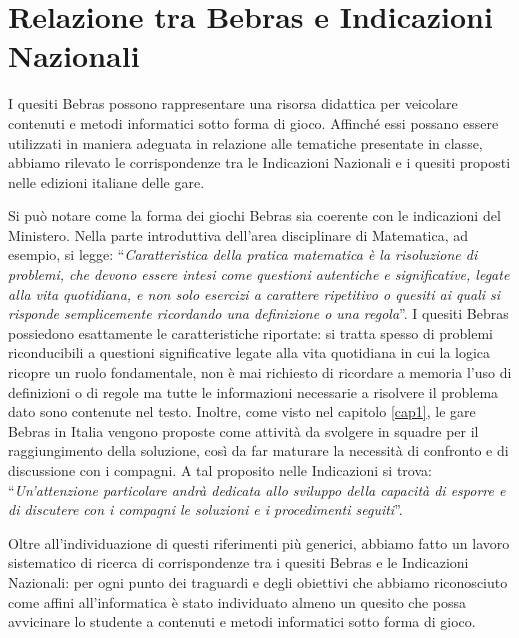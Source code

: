 \documentclass[12pt]{report}
\begin{document}
\section{Relazione tra Bebras e Indicazioni Nazionali} \label{classIndicazioni}

I quesiti Bebras possono rappresentare una risorsa didattica per veicolare contenuti e metodi informatici sotto forma di gioco. Affinché essi possano essere utilizzati in maniera adeguata in relazione alle tematiche presentate in classe, abbiamo rilevato le corrispondenze tra le Indicazioni Nazionali e i quesiti proposti nelle edizioni italiane delle gare.

Si può notare come la forma dei giochi Bebras sia coerente con le indicazioni del Ministero.
Nella parte introduttiva dell'area disciplinare di Matematica, ad esempio, si legge: ``\textit{Caratteristica della pratica matematica è la risoluzione di problemi, che devono essere intesi come questioni autentiche e significative, legate alla vita quotidiana, e non solo esercizi a carattere ripetitivo o quesiti ai quali si risponde semplicemente ricordando una definizione o una regola}''. I quesiti Bebras possiedono esattamente le caratteristiche riportate: si tratta spesso di problemi riconducibili a questioni significative legate alla vita quotidiana in cui la logica ricopre un ruolo fondamentale, non è mai richiesto di ricordare a memoria l’uso di definizioni o di regole ma tutte le informazioni necessarie a risolvere il problema dato sono contenute nel testo.
Inoltre, come visto nel capitolo \ref{cap1}, le gare Bebras in Italia vengono proposte come attività da svolgere in squadre per il raggiungimento della soluzione, così da far maturare la necessità di confronto e di discussione con i compagni. A tal proposito nelle Indicazioni si trova: ``\textit{Un’attenzione particolare andrà dedicata allo sviluppo della capacità di esporre e di discutere con i compagni le soluzioni e i procedimenti seguiti}''. 

Oltre all'individuazione di questi riferimenti più generici, abbiamo fatto un lavoro sistematico di ricerca di corrispondenze tra i quesiti Bebras e le Indicazioni Nazionali: per ogni punto dei traguardi e degli obiettivi che abbiamo riconosciuto come affini all'informatica è stato individuato almeno un quesito che possa avvicinare lo studente a contenuti e metodi informatici sotto forma di gioco.
\end{document}
